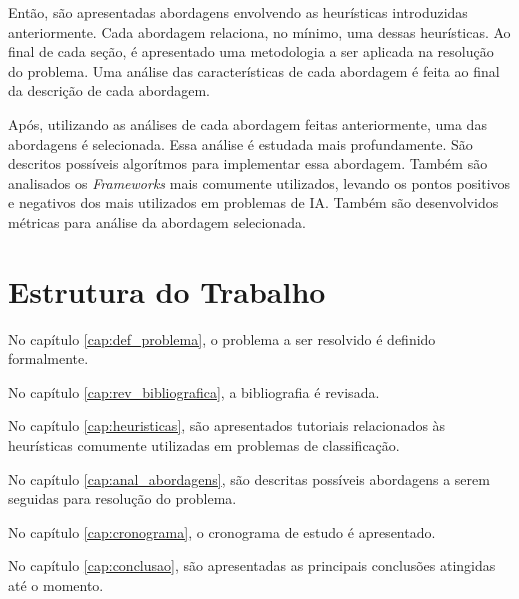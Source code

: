 Então, são apresentadas abordagens envolvendo as heurísticas introduzidas
anteriormente. Cada abordagem relaciona, no mínimo, uma dessas heurísticas.
Ao final de cada seção, é apresentado uma metodologia a ser aplicada
na resolução do problema. Uma análise das características de cada abordagem
é feita ao final da descrição de cada abordagem.

Após, utilizando as análises de cada abordagem feitas anteriormente,
uma das abordagens é selecionada. Essa análise é estudada mais profundamente.
São descritos possíveis algorítmos para implementar essa abordagem. Também são
analisados os \textit{Frameworks} mais comumente utilizados, levando os pontos
positivos e negativos dos mais utilizados em problemas de IA. Também são
desenvolvidos métricas para análise da abordagem selecionada.


\section{Estrutura do Trabalho}

No capítulo \ref{cap:def_problema}, o problema a ser resolvido é definido formalmente.

No capítulo \ref{cap:rev_bibliografica}, a bibliografia é revisada.

No capítulo \ref{cap:heuristicas}, são apresentados tutoriais relacionados às
heurísticas comumente utilizadas em problemas de classificação.

No capítulo \ref{cap:anal_abordagens}, são descritas possíveis abordagens a serem
seguidas para resolução do problema.

No capítulo \ref{cap:cronograma}, o cronograma de estudo é apresentado.

No capítulo \ref{cap:conclusao}, são apresentadas as principais conclusões atingidas
até o momento.
